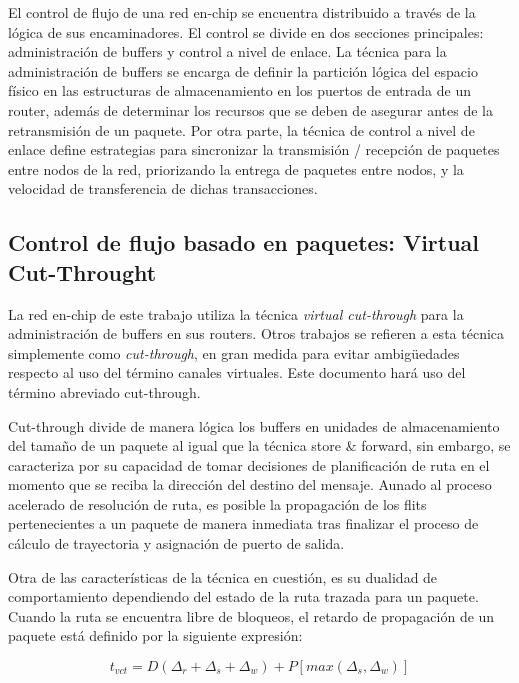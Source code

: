 El control de flujo de una red en-chip se encuentra distribuido a través de la lógica de sus encaminadores. El control se divide en dos secciones principales: administración de buffers y control a nivel de enlace. La técnica para la administración de buffers se encarga de definir la partición lógica del espacio físico en las estructuras de almacenamiento en los puertos de entrada de un router, además de determinar los recursos que se deben de asegurar antes de la retransmisión de un paquete. Por otra parte, la técnica de control a nivel de enlace define estrategias para sincronizar la transmisión / recepción de paquetes entre nodos de la red, priorizando la entrega de paquetes entre nodos, y la velocidad de transferencia de dichas transacciones.


\subsection{Control de flujo basado en paquetes: Virtual Cut-Throught}

La red en-chip de este trabajo utiliza la técnica \textit{virtual cut-through}\cite{chapter2:Kermani79:virtualcut-through} para la administración de buffers en sus routers. Otros trabajos se refieren a esta técnica simplemente como \textit{cut-through}, en gran medida para evitar ambigüedades respecto al uso del término canales virtuales. Este documento hará uso del término abreviado cut-through.

Cut-through divide de manera lógica los buffers en unidades de almacenamiento del tamaño de un paquete al igual que la técnica store \& forward, sin embargo, se caracteriza por su capacidad de tomar decisiones de planificación de ruta en el momento que se reciba la dirección del destino del mensaje. Aunado al proceso acelerado de resolución de ruta, es posible la propagación de los flits pertenecientes a un paquete de manera inmediata tras finalizar el proceso de cálculo de trayectoria y asignación de puerto de salida.

Otra de las características de la técnica en cuestión, es su dualidad de comportamiento dependiendo del estado de la ruta trazada para un paquete. Cuando la ruta se encuentra libre de bloqueos, el retardo de propagación de un paquete está definido por la siguiente expresión:

\begin{equation}
	t_{vct} = D(\Delta_{r} + \Delta_{s} + \Delta_{w}) + P[max(\Delta_{s}, \Delta_{w})]
	\label{eq:t_vct}
\end{equation}

